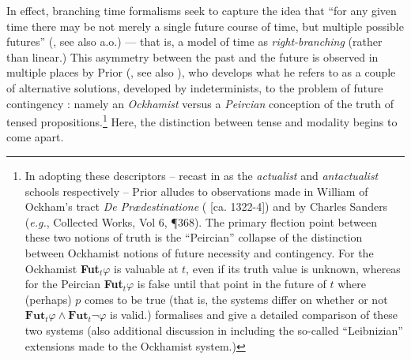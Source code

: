 \documentclass[12pt,dvipsnames]{report}
\begin{document}
 In effect, branching time formalisms seek to capture the idea that ``for any given time there may be not merely a single future course of time, but multiple possible futures'' (\citealp[63]{Dowty1977}, see also \citealp{Thomason1970,Burgess1978} a.o.) --- that is, a model of time as \textit{right-branching} (rather than linear.) This asymmetry between the past and the future is observed in multiple places by Prior (\citeyear{Prior1957,Prior1967}, see also \citealt{Copeland2020}), who develops what he refers to as a couple of alternative solutions, developed by indeterminists, to the problem of future contingency \citeyearpar[\textit{e.g.},][121\textit{ff}]{Prior1967}: namely an \textit{Ockhamist} versus a \textit{Peircian} conception of the truth of tensed propositions.\footnote{In adopting these descriptors -- recast in \citealt{Burgess1978} as the \textit{actualist} and \textit{antactualist} schools respectively -- Prior alludes to observations made in William of Ockham's tract \textit{De Prædestinatione} (\citeyear{praedestinatione} [ca. 1322-4]) and by Charles Sanders \citeauthor{Peirce} (\textit{e.g.}, Collected Works, Vol 6, ¶368). The primary flection point between these two notions of truth is the ``Peircian'' collapse of the distinction between Ockhamist notions of future necessity and contingency. For the Ockhamist \textbf{Fut}$ _t\varphi$ is valuable at $ t $, even if its truth value is unknown, whereas for the Peircian \textbf{Fut}$_t\varphi $ is false until that point in the future of $ t $ where (perhaps) $ p $ comes to be true (that is, the systems differ on whether or not $ \textbf{Fut}_t\varphi\wedge\textbf{Fut}_t\neg\varphi $ is valid.) \citet[126\textit{ff}]{Prior1967} formalises and give a detailed comparison of these two systems (also additional discussion in \citealp{Øhrstrøm1995,Øhrstrøm2020,Nishimura1979} including the so-called ``Leibnizian'' extensions made to the Ockhamist system.)\label{FutCont}} Here, the distinction between tense and modality begins to come apart.
\end{document}
